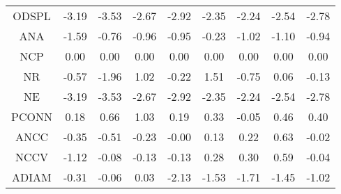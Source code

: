 \begin{longtable}{ | c || c | c | c | c | c | c | c || c |}
ODSPL &  \cellcolor[HTML]{FFAFAF} -3.19 &  \cellcolor[HTML]{FFA7A7} -3.53 &  \cellcolor[HTML]{FFBFBF} -2.67 &  \cellcolor[HTML]{FFB7B7} -2.92 &  \cellcolor[HTML]{FFC7C7} -2.35 &  \cellcolor[HTML]{FFC7C7} -2.24 &  \cellcolor[HTML]{FFBFBF} -2.54 &  \cellcolor[HTML]{FFB7B7} -2.78 \\
ANA &  \cellcolor[HTML]{FFD7D7} -1.59 &  \cellcolor[HTML]{FFEFEF} -0.76 &  \cellcolor[HTML]{FFE7E7} -0.96 &  \cellcolor[HTML]{FFE7E7} -0.95 &  \cellcolor[HTML]{FFF7F7} -0.23 &  \cellcolor[HTML]{FFE7E7} -1.02 &  \cellcolor[HTML]{FFE7E7} -1.10 &  \cellcolor[HTML]{FFE7E7} -0.94 \\
NCP &  \cellcolor[HTML]{FFFFFF} 0.00 &  \cellcolor[HTML]{FFFFFF} 0.00 &  \cellcolor[HTML]{FFFFFF} 0.00 &  \cellcolor[HTML]{FFFFFF} 0.00 &  \cellcolor[HTML]{FFFFFF} 0.00 &  \cellcolor[HTML]{FFFFFF} 0.00 &  \cellcolor[HTML]{FFFFFF} 0.00 &  \cellcolor[HTML]{FFFFFF} 0.00 \\
NR &  \cellcolor[HTML]{FFEFEF} -0.57 &  \cellcolor[HTML]{FFCFCF} -1.96 &  \cellcolor[HTML]{E7E7FF} 1.02 &  \cellcolor[HTML]{FFF7F7} -0.22 &  \cellcolor[HTML]{D7D7FF} 1.51 &  \cellcolor[HTML]{FFEFEF} -0.75 &  \cellcolor[HTML]{FFFFFF} 0.06 &  \cellcolor[HTML]{FFFFFF} -0.13 \\
NE &  \cellcolor[HTML]{FFAFAF} -3.19 &  \cellcolor[HTML]{FFA7A7} -3.53 &  \cellcolor[HTML]{FFBFBF} -2.67 &  \cellcolor[HTML]{FFB7B7} -2.92 &  \cellcolor[HTML]{FFC7C7} -2.35 &  \cellcolor[HTML]{FFC7C7} -2.24 &  \cellcolor[HTML]{FFBFBF} -2.54 &  \cellcolor[HTML]{FFB7B7} -2.78 \\
PCONN &  \cellcolor[HTML]{F7F7FF} 0.18 &  \cellcolor[HTML]{EFEFFF} 0.66 &  \cellcolor[HTML]{E7E7FF} 1.03 &  \cellcolor[HTML]{F7F7FF} 0.19 &  \cellcolor[HTML]{F7F7FF} 0.33 &  \cellcolor[HTML]{FFFFFF} -0.05 &  \cellcolor[HTML]{F7F7FF} 0.46 &  \cellcolor[HTML]{F7F7FF} 0.40 \\
ANCC &  \cellcolor[HTML]{FFF7F7} -0.35 &  \cellcolor[HTML]{FFEFEF} -0.51 &  \cellcolor[HTML]{FFF7F7} -0.23 &  \cellcolor[HTML]{FFFFFF} -0.00 &  \cellcolor[HTML]{FFFFFF} 0.13 &  \cellcolor[HTML]{F7F7FF} 0.22 &  \cellcolor[HTML]{EFEFFF} 0.63 &  \cellcolor[HTML]{FFFFFF} -0.02 \\
NCCV &  \cellcolor[HTML]{FFDFDF} -1.12 &  \cellcolor[HTML]{FFFFFF} -0.08 &  \cellcolor[HTML]{FFFFFF} -0.13 &  \cellcolor[HTML]{FFFFFF} -0.13 &  \cellcolor[HTML]{F7F7FF} 0.28 &  \cellcolor[HTML]{F7F7FF} 0.30 &  \cellcolor[HTML]{EFEFFF} 0.59 &  \cellcolor[HTML]{FFFFFF} -0.04 \\
ADIAM &  \cellcolor[HTML]{FFF7F7} -0.31 &  \cellcolor[HTML]{FFFFFF} -0.06 &  \cellcolor[HTML]{FFFFFF} 0.03 &  \cellcolor[HTML]{FFC7C7} -2.13 &  \cellcolor[HTML]{FFD7D7} -1.53 &  \cellcolor[HTML]{FFD7D7} -1.71 &  \cellcolor[HTML]{FFD7D7} -1.45 &  \cellcolor[HTML]{FFE7E7} -1.02 \\

\end{longtable}
